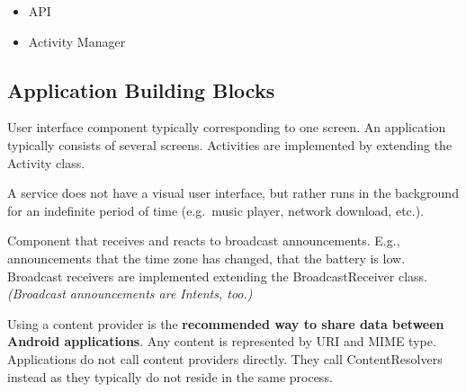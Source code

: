 \begin{breakbox}

\begin{itemize}
\tightlist
\item
  API
\item
  Activity Manager
\end{itemize}

\end{breakbox}

\subsection{Application Building Blocks}

\begin{breakbox}

User interface component typically corresponding to one screen. An
application typically consists of several screens. Activities are
implemented by extending the Activity class.

\end{breakbox}

\begin{breakbox}

A service does not have a visual user interface, but rather runs in the
background for an indefinite period of time (e.g.~music player, network
download, etc.).

\end{breakbox}

\begin{breakbox}

Component that receives and reacts to broadcast announcements. E.g.,
announcements that the time zone has changed, that the battery is low.
Broadcast receivers are implemented extending the BroadcastReceiver
class. \textit{(Broadcast announcements are Intents, too.)}

\end{breakbox}

\begin{breakbox}

Using a content provider is the \textbf{recommended way to share data
between Android applications}. Any content is represented by URI and
MIME type. Applications do not call content providers directly. They
call ContentResolvers instead as they typically do not reside in the
same process.

\end{breakbox}


